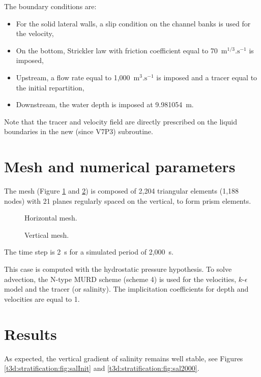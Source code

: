 \bigskip
The boundary conditions are:
\begin{itemize}
\item For the solid lateral walls, a slip condition 
on the channel banks is used for the velocity,
\item On the bottom, Strickler law with friction coefficient equal to 
70~$\text{m}^{1/3}.\text{s}^{-1}$ is imposed,
\item Upstream, a flow rate equal to 1,000~$\text{m}^{3}.\text{s}^{-1}$ is imposed
and a tracer equal to the initial repartition,
\item Downstream, the water depth is imposed at 9.981054~m.
\end{itemize}
Note that the tracer and velocity field are directly prescribed on the liquid
boundaries in the new (since V7P3)  subroutine.

\section{Mesh and numerical parameters}
\bigskip
The mesh (Figure \ref{t3d:stratification:fig:meshH} and \ref{t3d:stratification:fig:meshV})  
is composed of 2,204 triangular elements (1,188 nodes) with 21 planes  
regularly spaced on the vertical, to form prism elements.\\

\begin{figure}[!htbp]
 \centering
 \caption{Horizontal mesh.}
 \label{t3d:stratification:fig:meshH}
\end{figure}
\begin{figure}[!htbp]
 \centering
 \caption{Vertical mesh.}
 \label{t3d:stratification:fig:meshV}
\end{figure}

%
\bigskip
The time step is 2~s for a simulated period of 2,000~s. 

\bigskip
This case is computed with the hydrostatic pressure hypothesis.  To solve advection, the N-type MURD scheme (scheme 4) 
is used for the velocities, $k$-$\epsilon$ model and the tracer (or salinity). 
The implicitation coefficients for depth and velocities are equal to 1.\\
%
\section{Results}
%
\bigskip
As expected, the vertical gradient of salinity remains well stable, see Figures
\ref{t3d:stratification:fig:salInit} and \ref{t3d:stratification:fig:sal2000}.

